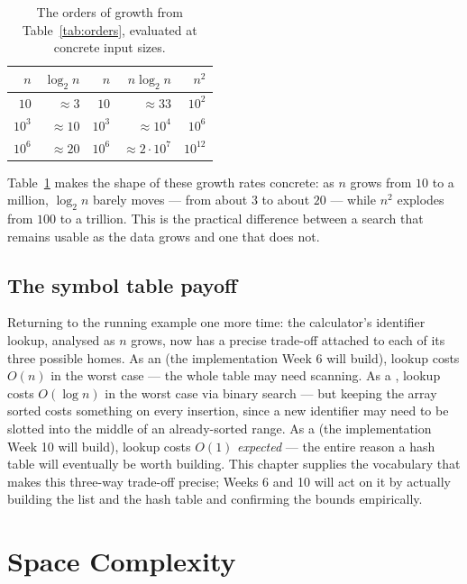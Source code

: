 \documentclass[11pt]{article}
\begin{document}
\begin{table}[h]
\centering
\begin{tabular}{rrrrr}
\toprule
$n$ & $\log_2 n$ & $n$ & $n \log_2 n$ & $n^2$ \\
\midrule
$10$   & $\approx 3$  & $10$   & $\approx 33$        & $10^2$ \\
$10^3$ & $\approx 10$ & $10^3$ & $\approx 10^4$       & $10^6$ \\
$10^6$ & $\approx 20$ & $10^6$ & $\approx 2\cdot10^7$ & $10^{12}$ \\
\bottomrule
\end{tabular}
\caption{The orders of growth from Table~\ref{tab:orders}, evaluated at
concrete input sizes.}
\label{tab:numbers}
\end{table}

Table~\ref{tab:numbers} makes the shape of these growth rates concrete: as
$n$ grows from $10$ to a million, $\log_2 n$ barely moves --- from about $3$
to about $20$ --- while $n^2$ explodes from $100$ to a trillion. This is the
practical difference between a search that remains usable as the data grows
and one that does not.

\subsection{The symbol table payoff}
\label{sec:searches-payoff}

Returning to the running example one more time: the calculator's identifier
lookup, analysed as $n$ grows, now has a precise trade-off attached to each
of its three possible homes. As an  (the implementation
Week 6 will build), lookup costs $O(n)$ in the worst case --- the whole
table may need scanning. As a , lookup costs $O(\log n)$
in the worst case via binary search --- but keeping the array sorted costs
something on every insertion, since a new identifier may need to be slotted
into the middle of an already-sorted range. As a  (the
implementation Week 10 will build), lookup costs $O(1)$ \emph{expected} ---
the entire reason a hash table will eventually be worth building. This
chapter supplies the vocabulary that makes this three-way trade-off
precise; Weeks 6 and 10 will act on it by actually building the list and the
hash table and confirming the bounds empirically.

\section{Space Complexity}
\label{sec:space}
\end{document}

